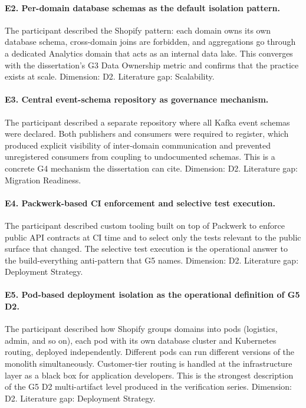 \paragraph*{E2. Per-domain database schemas as the default isolation pattern.} The participant described the Shopify pattern: each domain owns its own database schema, cross-domain joins are forbidden, and aggregations go through a dedicated Analytics domain that acts as an internal data lake. This converges with the dissertation's G3 Data Ownership metric and confirms that the practice exists at scale. Dimension: D2. Literature gap: Scalability.

\paragraph*{E3. Central event-schema repository as governance mechanism.} The participant described a separate repository where all Kafka event schemas were declared. Both publishers and consumers were required to register, which produced explicit visibility of inter-domain communication and prevented unregistered consumers from coupling to undocumented schemas. This is a concrete G4 mechanism the dissertation can cite. Dimension: D2. Literature gap: Migration Readiness.

\paragraph*{E4. Packwerk-based CI enforcement and selective test execution.} The participant described custom tooling built on top of Packwerk to enforce public API contracts at CI time and to select only the tests relevant to the public surface that changed. The selective test execution is the operational answer to the build-everything anti-pattern that G5 names. Dimension: D2. Literature gap: Deployment Strategy.

\paragraph*{E5. Pod-based deployment isolation as the operational definition of G5 D2.} The participant described how Shopify groups domains into pods (logistics, admin, and so on), each pod with its own database cluster and Kubernetes routing, deployed independently. Different pods can run different versions of the monolith simultaneously. Customer-tier routing is handled at the infrastructure layer as a black box for application developers. This is the strongest description of the G5 D2 multi-artifact level produced in the verification series. Dimension: D2. Literature gap: Deployment Strategy.

